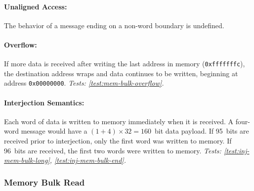 \paragraph{Unaligned Access:} The behavior of a message ending on a
non-word boundary is undefined.

\paragraph{Overflow:} If more data is received after writing the last
address in memory ({\tt 0xfffffffc}), the destination address wraps and data
continues to be written, beginning at address {\tt 0x00000000}.
{\em Tests: \ref{test:mem-bulk-overflow}.}

\paragraph{Interjection Semantics:} Each word of data is written to memory
immediately when it is received. A four-word message would have a
$(1+4)\times32=160$~bit data payload. If 95~bits are received prior to
interjection, only the first word was written to memory. If 96~bits are
received, the first two words were written to memory.
{\em Tests: \ref{test:inj-mem-bulk-long}, \ref{test:inj-mem-bulk-end}.}

\subsubsection{Memory Bulk Read}
\label{cmd:mem-bulk-read}


